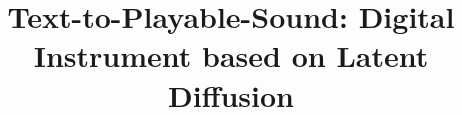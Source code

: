 \documentclass{nime-alternate} %
\begin{document}


\title{Text-to-Playable-Sound: Digital Instrument based on Latent Diffusion}

%
%
%
\label{key}%
%
\end{document}
